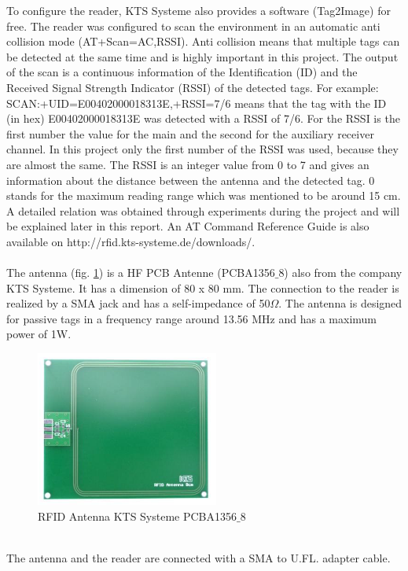 To configure the reader, KTS Systeme also provides a software (Tag2Image) for free. The reader was configured to scan the environment in an automatic anti collision mode (AT+Scan=AC,RSSI). Anti collision means that multiple tags can be detected at the same time and is highly important in this project. The output of the scan is a continuous information of the Identification (ID) and the Received Signal Strength Indicator (RSSI) of the detected tags. For example: SCAN:+UID=E00402000018313E,+RSSI=7/6 means that the tag with the ID (in hex) E00402000018313E was detected with a RSSI of 7/6. For the RSSI is the first number the value for the main and the second for the auxiliary receiver channel. In this project only the first number of the RSSI was used, because they are almost the same. The RSSI is an integer value from 0 to 7 and gives an information about the distance between the antenna and the detected tag. 0 stands for the maximum reading range which was mentioned to be around 15 cm. A detailed relation was obtained through experiments during the project and will be explained later in this report. An AT Command Reference Guide is also available on http://rfid.kts-systeme.de/downloads/.\\
\\
The antenna (fig. \ref{Antenna}) is a HF PCB Antenne (PCBA1356$\_$8) also from the company KTS Systeme. It has a dimension of 80 x 80 mm. The connection to the reader is realized by a SMA jack and has a self-impedance of 50$\Omega$. The antenna is designed for passive tags in a frequency range around 13.56 MHz and has a maximum power of 1W. \\
\begin{figure}[!htbp]
\centering
\includegraphics[width = 6cm]{Pictures/Antenna}
\caption{RFID Antenna KTS Systeme PCBA1356$\_$8}
\label{Antenna}
\end{figure}\\
The antenna and the reader are connected with a SMA to U.FL. adapter cable.\\

